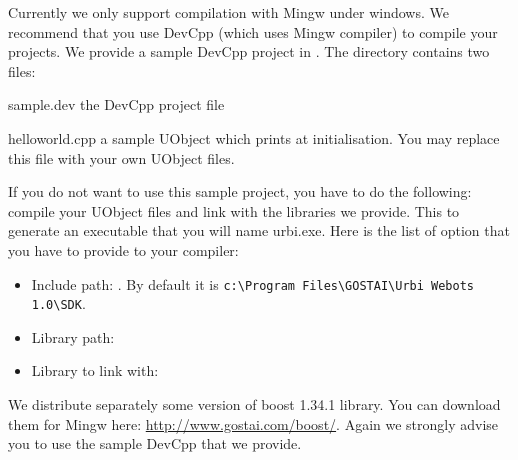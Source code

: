 Currently we only support compilation with Mingw under windows. We
recommend that you use DevCpp (which uses Mingw compiler) to compile
your projects.  We provide a sample DevCpp project in
.  The directory contains two files:
\begin{files*}
\item[sample.dev] the DevCpp project file
\item[helloworld.cpp] a sample UObject which prints  at initialisation. You may replace this file with your own
  UObject files.
\end{files*}

If you do not want to use this sample project, you have to do the
following: compile your UObject files and link with the libraries we
provide. This to generate an executable that you will name urbi.exe.
Here is the list of option that you have to provide to your compiler:
\begin{itemize}
\item Include path: . By default it
  is \verb+c:\Program Files\GOSTAI\Urbi Webots 1.0\SDK+.

\item Library path:

\item Library to link with:
\end{itemize}
We distribute separately some version of boost 1.34.1 library. You can
download them for Mingw here: \url{http://www.gostai.com/boost/}.
Again we strongly advise you to use the sample DevCpp that we provide.


